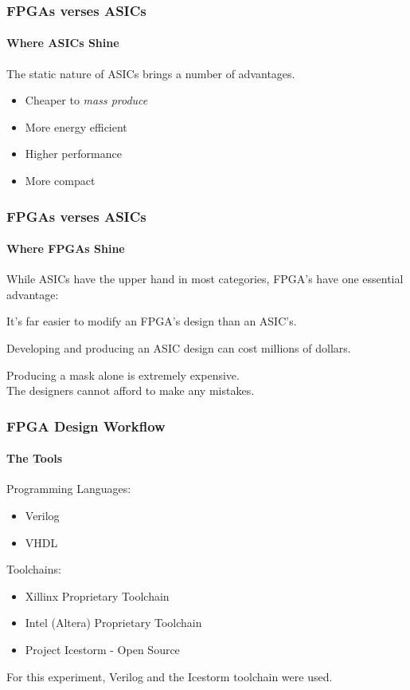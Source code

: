 \documentclass{beamer}
\begin{document}
  
  \begin{frame}
    \frametitle{FPGAs verses ASICs}
    \framesubtitle{Where ASICs Shine}

    The static nature of ASICs brings a number of advantages.

    \vfill
    
    \begin{itemize}
      \item Cheaper to \textit{mass produce}
      \item More energy efficient
      \item Higher performance
      \item More compact
    \end{itemize}

  \end{frame}

  \begin{frame}
    \frametitle{FPGAs verses ASICs}
    \framesubtitle{Where FPGAs Shine}

    \AlegreyaSansMedium While ASICs have the upper hand in most categories, FPGA's have
    one essential advantage:

    \vfill
    
    \AlegreyaBlack It's far easier to modify an FPGA's design than an ASIC's.
    
    \vfill
      
    \AlegreyaSansMedium Developing and producing an ASIC design can cost \AlegreyaBlack
    millions of dollars. \\
    
    \vfill
    
    \AlegreyaSansMedium Producing a mask alone is extremely expensive. \\
    The designers cannot afford to make any mistakes. \\

  \end{frame}

  
  \begin{frame}
    \frametitle{FPGA Design Workflow}
    \framesubtitle{The Tools}

    Programming Languages:
    
    \begin{itemize}
      \item Verilog
      \item VHDL
    \end{itemize}

    \vfill

    Toolchains:
    
    \begin{itemize}
      \item Xillinx Proprietary Toolchain
      \item Intel (Altera) Proprietary Toolchain 
      \item Project Icestorm - Open Source
    \end{itemize}

    \vfill

    For this experiment, Verilog and the Icestorm toolchain were used.

  \end{frame}
\end{document}
